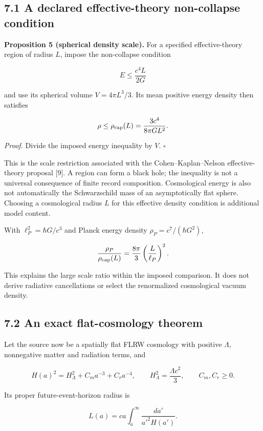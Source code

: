 \documentclass[
  11pt,
  a4paper,
]{article}
\begin{document}
\subsection{7.1 A declared effective-theory non-collapse condition}\label{a-declared-effective-theory-non-collapse-condition}

\textbf{Proposition 5 (spherical density scale).} For a specified effective-theory region of radius \(L\), impose the non-collapse condition

\[
E\leq\frac{c^4L}{2G}
\]

and use its spherical volume \(V=4\pi L^3/3\). Its mean positive energy density then satisfies

\[
\rho\leq\rho_{\rm cap}(L)=\frac{3c^4}{8\pi GL^2}.
\]

\emph{Proof.} Divide the imposed energy inequality by \(V\). \(\square\)

This is the scale restriction associated with the Cohen--Kaplan--Nelson effective-theory proposal {[}9{]}. A region can form a black hole; the inequality is not a universal consequence of finite record composition. Cosmological energy is also not automatically the Schwarzschild mass of an asymptotically flat sphere. Choosing a cosmological radius \(L\) for this effective density condition is additional model content.

With \(\ell_P^2=\hbar G/c^3\) and Planck energy density \(\rho_P=c^7/(\hbar G^2)\),

\[
\frac{\rho_P}{\rho_{\rm cap}(L)}
=\frac{8\pi}{3}\left(\frac L{\ell_P}\right)^2.
\]

This explains the large scale ratio within the imposed comparison. It does not derive radiative cancellations or select the renormalized cosmological vacuum density.

\subsection{7.2 An exact flat-cosmology theorem}\label{an-exact-flat-cosmology-theorem}

Let the source now be a spatially flat FLRW cosmology with positive \(\Lambda\), nonnegative matter and radiation terms, and

\[
H(a)^2=H_\Lambda^2+C_m a^{-3}+C_r a^{-4},
\qquad H_\Lambda^2=\frac{\Lambda c^2}{3},
\qquad C_m,C_r\geq0.
\]

Its proper future-event-horizon radius is

\[
L(a)=ca\int_a^\infty\frac{da'}{a'^2H(a')}.
\]
\end{document}
